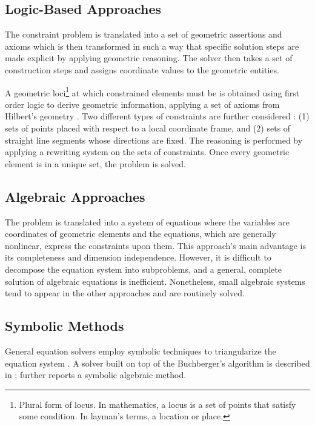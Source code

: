 \subsection{Logic-Based Approaches}
\label{sec:intro.constraints.logic}

The constraint problem is translated into a set of geometric assertions and
axioms which is then transformed in such a way that specific solution steps are
made explicit by applying geometric reasoning.  The solver then takes a set of
construction steps and assigns coordinate values to the geometric entities.

A geometric loci\footnote{Plural form of locus.  In mathematics, a locus is a
set of points that satisfy some condition. In layman's terms, a location or
place.} at which constrained elements must be is obtained using first order
logic to derive geometric information, applying a set of axioms from Hilbert's
geometry \cite{Aldefeld:1988:VGBGRM,Bruderlin:1993:USGRRSGSS,Sohrt:1991:IC3DM}.
Two different types of constraints are further considered
\cite{Sunde:1987:CADSDSS,Verroust:1992:RMPCAD}: (1) sets of points placed with
respect to a local coordinate frame, and (2) sets of straight line segments
whose directions are fixed.  The reasoning is performed by applying a rewriting
system on the sets of constraints.  Once every geometric element is in a unique
set, the problem is solved.

\subsection{Algebraic Approaches}
\label{sec:intro.constraints.algebraic}

The problem is translated into a system of equations where the variables are
coordinates of geometric elements and the equations, which are generally
nonlinear, express the constraints upon them.  This approach's main advantage is
its completeness and dimension independence.  However, it is difficult to
decompose the equation system into subproblems, and a general, complete solution
of algebraic equations is inefficient.  Nonetheless, small algebraic systems
tend to appear in the other approaches and are routinely solved.

\subsection{Symbolic Methods}
\label{sec:intro.constraints.symbolic}

General equation solvers employ symbolic techniques to triangularize the
equation system \cite{Buchberger:1985:Grobner,Chou:1988:IWMMTPG}.  A solver
built on top of the Buchberger's algorithm is described in
\cite{Buchanan:1993:CDS}; \citet{Kondo:1992:AMMDRGM} further reports a symbolic
algebraic method.

